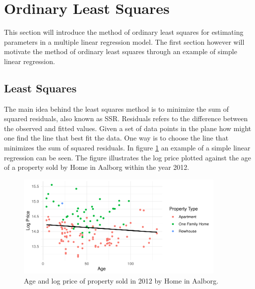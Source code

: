 \section{Ordinary Least Squares}
This section will introduce the method of ordinary least squares for estimating parameters in a multiple linear regression model.
The first section however will motivate the method of ordinary least squares through an example of simple linear regression.

\subsection{Least Squares}
The main idea behind the least squares method is to minimize the sum of squared residuals, also known as SSR.
Residuals refers to the difference between the observed and fitted values.
Given a set of data points in the plane how might one find the line that best fit the data. 
One way is to choose the line that minimizes the sum of squared residuals.
In figure \ref{fig:example_simple_linear_regression} an example of a simple linear regression can be seen. 
The figure illustrates the log price plotted against the age of a property sold by Home in Aalborg within the year 2012.

\begin{figure}[h]
    \centering
    \includegraphics[width = 0.9\textwidth]{figures/Ordinary_Least_Squares/example_linear_regression.pdf}
    \caption{Age and log price of property sold in 2012 by Home in Aalborg.}
    \label{fig:example_simple_linear_regression}
\end{figure}

